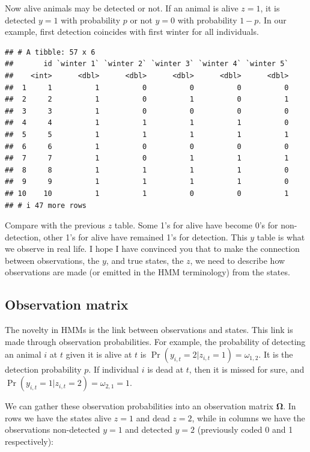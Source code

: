 \documentclass[
  12pt,
]{krantz}
\begin{document}
Now alive animals may be detected or not. If an animal is alive \(z = 1\), it is detected \(y = 1\) with probability \(p\) or not \(y = 0\) with probability \(1-p\). In our example, first detection coincides with first winter for all individuals.

\begin{verbatim}
## # A tibble: 57 x 6
##       id `winter 1` `winter 2` `winter 3` `winter 4` `winter 5`
##    <int>      <dbl>      <dbl>      <dbl>      <dbl>      <dbl>
##  1     1          1          0          0          0          0
##  2     2          1          0          1          0          1
##  3     3          1          0          0          0          0
##  4     4          1          1          1          1          0
##  5     5          1          1          1          1          1
##  6     6          1          0          0          0          0
##  7     7          1          0          1          1          1
##  8     8          1          1          1          1          0
##  9     9          1          1          1          1          0
## 10    10          1          1          0          0          1
## # i 47 more rows
\end{verbatim}

Compare with the previous \(z\) table. Some 1's for alive have become 0's for non-detection, other 1's for alive have remained 1's for detection. This \(y\) table is what we observe in real life. I hope I have convinced you that to make the connection between observations, the \(y\), and true states, the \(z\), we need to describe how observations are made (or emitted in the HMM terminology) from the states.

\subsection{Observation matrix}\label{observation-matrix}

The novelty in HMMs is the link between observations and states. This link is made through observation probabilities. For example, the probability of detecting an animal \(i\) at \(t\) given it is alive at \(t\) is \(\Pr(y_{i,t}=2|z_{i,t}=1)=\omega_{1,2}\). It is the detection probability \(p\). If individual \(i\) is dead at \(t\), then it is missed for sure, and \(\Pr(y_{i,t}=1|z_{i,t}=2)=\omega_{2,1}=1\).

We can gather these observation probabilities into an observation matrix \(\mathbf{\Omega}\). In rows we have the states alive \(z = 1\) and dead \(z = 2\), while in columns we have the observations non-detected \(y = 1\) and detected \(y = 2\) (previously coded 0 and 1 respectively):
\end{document}
